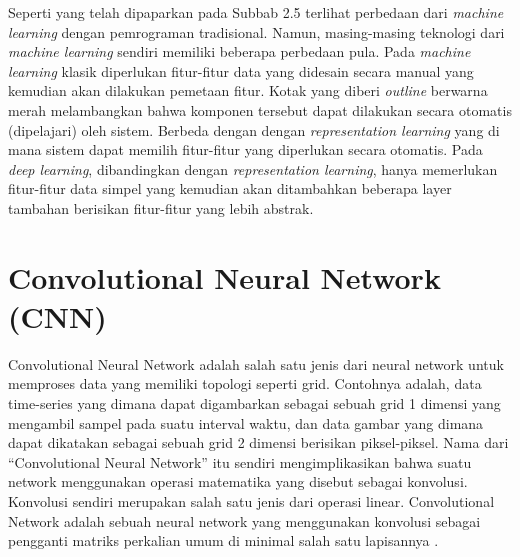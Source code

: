Seperti yang telah dipaparkan pada Subbab 2.5 terlihat perbedaan dari \emph{machine learning} dengan pemrograman tradisional. Namun, masing-masing teknologi dari \emph{machine learning} sendiri memiliki beberapa perbedaan pula. Pada \emph{machine learning} klasik diperlukan fitur-fitur data yang didesain secara manual yang kemudian akan dilakukan pemetaan fitur. Kotak yang diberi \emph{outline} berwarna merah melambangkan bahwa komponen tersebut dapat dilakukan secara otomatis (dipelajari) oleh sistem. Berbeda dengan dengan \emph{representation learning} yang di mana sistem dapat memilih fitur-fitur yang diperlukan secara otomatis. Pada \emph{deep learning}, dibandingkan dengan \emph{representation learning}, hanya memerlukan fitur-fitur data simpel yang kemudian akan ditambahkan beberapa layer tambahan berisikan fitur-fitur yang lebih abstrak.



\section{Convolutional Neural Network (CNN)}
\label{sec:cnn}
Convolutional Neural Network adalah salah satu jenis dari neural network untuk memproses data yang memiliki topologi seperti grid. Contohnya adalah, data time-series yang dimana dapat digambarkan sebagai sebuah grid 1 dimensi yang mengambil sampel pada suatu interval waktu, dan data gambar yang dimana dapat dikatakan sebagai sebuah grid 2 dimensi berisikan piksel-piksel. Nama dari “Convolutional Neural Network” itu sendiri mengimplikasikan bahwa suatu network menggunakan operasi matematika yang disebut sebagai konvolusi. Konvolusi sendiri merupakan salah satu jenis dari operasi linear. Convolutional Network adalah sebuah neural network yang menggunakan konvolusi sebagai pengganti matriks perkalian umum di minimal salah satu lapisannya \citep{deepL}.

